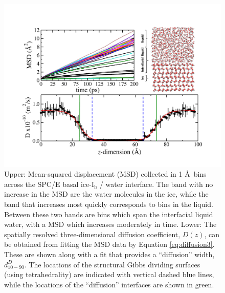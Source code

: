 \begin{figure}
\includegraphics[width=\linewidth]{Figures/DzSPCE}
\caption{\label{fig:DzSPCE} Upper: Mean-squared displacement (MSD)
  collected in 1 \AA~bins across the SPC/E basal ice-I$_\mathrm{h}$ /
  water interface. The band with no increase in the MSD are the water
  molecules in the ice, while the band that increases most quickly
  corresponds to bins in the liquid. Between these two bands are bins
  which span the interfacial liquid water, with a MSD which increases
  moderately in time. Lower: The spatially resolved three-dimensional
  diffusion coefficient, $D(z)$, can be obtained from fitting the MSD
  data by Equation \eqref{eq:diffusion3}. These are shown along with a fit
  that provides a ``diffusion'' width, $d_{10-90}^{D}$. The locations
  of the structural Gibbs dividing surfaces (using tetrahedrality) are
  indicated with vertical dashed blue lines, while the locations of
  the ``diffusion'' interfaces are shown in green.  }
\end{figure}

